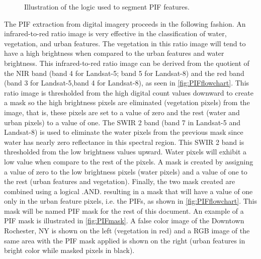 \begin{figure}[htb]
\caption{Illustration of the logic used to segment PIF features. \label{fig:PIFflowchart}}
\end{figure}

The PIF extraction from digital imagery proceeds in the following fashion. An infrared-to-red ratio image is very effective in the classification of water, vegetation, and urban features. The vegetation in this ratio image will tend to have a high brightness when compared to the urban features and water brightness. This infrared-to-red ratio image can be derived from the quotient of the NIR band (band 4 for Landsat-5; band 5 for Landsat-8) and the red band (band 3 for Landsat-5,band 4 for Landsat-8), as seen in \autoref{fig:PIFflowchart}. This ratio image is thresholded from the high digital count values downward to create a mask so the high brightness pixels are eliminated (vegetation pixels) from the image, that is, these pixels are set to a value of zero and the rest (water and urban pixels) to a value of one. The SWIR 2 band (band 7 in Landsat-5 and Landsat-8) is used to eliminate the water pixels from the previous mask since water has nearly zero reflectance in this spectral region. This SWIR 2 band is thresholded from the low brightness values upward. Water pixels will exhibit a low value when compare to the rest of the pixels. A mask is created by assigning a value of zero to the low brightness pixels (water pixels) and a value of one to the rest (urban features and vegetation). Finally, the two mask created are combined using a logical .AND. resulting in a mask that will have a value of one only in the urban feature pixels, i.e. the PIFs, as shown in \autoref{fig:PIFflowchart}. This mask will be named PIF mask for the rest of this document. An example of a PIF mask is illustrated in \autoref{fig:PIFmask}. A false color image of the Downtown Rochester, NY is shown on the left (vegetation in red) and a RGB image of the same area with the PIF mask applied is shown on the right (urban features in bright color while masked pixels in black).

